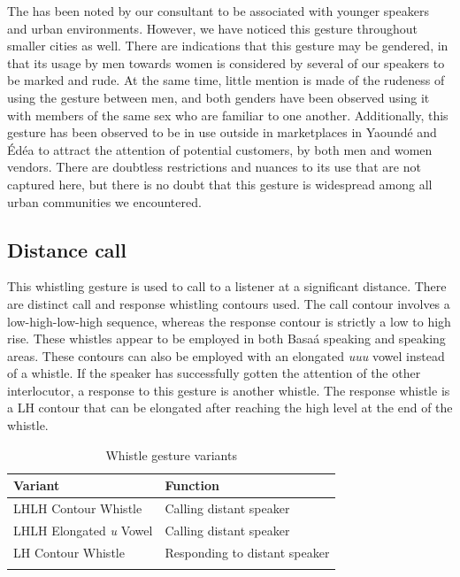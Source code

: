 \documentclass[output=paper
,newtxmath
,modfonts
,nonflat]{langsci/langscibook}
\begin{document}
The  has been noted by our  consultant to be associated with younger speakers and urban environments. However, we have noticed this gesture throughout smaller cities as well. There are indications that this gesture may be gendered, in that its usage by men towards women is considered by several of our speakers to be marked and rude. At the same time, little mention is made of the rudeness of using the gesture between men, and both genders have been observed using it with members of the same sex who are familiar to one another. Additionally, this gesture has been observed to be in use outside in marketplaces in Yaound\'e and \'Ed\'ea to attract the attention of potential customers, by both men and women vendors. There are doubtless restrictions and nuances to its use that are not captured here, but there is no doubt that this gesture is widespread among all urban communities we encountered. 

\subsection{Distance call}
This whistling gesture is used to call to a listener at a significant distance. There are distinct call and response whistling contours used. The call contour involves a low-high-low-high sequence, whereas the response contour is strictly a low to high rise. These whistles appear to be employed in both Basa\'a speaking and  speaking areas. These contours can also be employed with an elongated \textit{uuu} vowel instead of a whistle. If the speaker has successfully gotten the attention of the other interlocutor, a response to this gesture is another whistle. The response whistle is a LH contour that can be elongated after reaching the high level  at the end of the whistle. 

\begin{table}
\caption{Whistle gesture variants}
\begin{tabular}{ll} 
\lsptoprule
Variant & Function \\ \midrule
LHLH Contour Whistle & Calling distant speaker \\ 
LHLH Elongated \textit{u} Vowel & Calling distant speaker \\ 
LH Contour Whistle & Responding to distant speaker \\ \lspbottomrule
\end{tabular}
\end{table}
\end{document}

